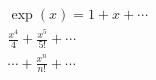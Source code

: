 $
      \begin{multline}
      \exp(x) = 1 + x + \cdots \\
      \frac{x^4}4 + \frac{x^5}{5!} + \cdots \\
      \cdots + \frac{x^n}{n!} + \cdots
      \end{multline}
$
